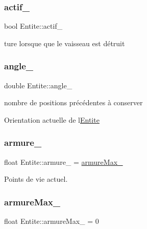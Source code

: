 \subsubsection{\texorpdfstring{actif\+\_\+}{actif\_}}
{\footnotesize\ttfamily bool Entite\+::actif\+\_\+\hspace{0.3cm}{\ttfamily [protected]}}



ture lorsque que le vaisseau est détruit 

\mbox{\label{class_entite_a0ff0818c364a2d4282f99e309728f479}} 
\subsubsection{\texorpdfstring{angle\+\_\+}{angle\_}}
{\footnotesize\ttfamily double Entite\+::angle\+\_\+\hspace{0.3cm}{\ttfamily [protected]}}



nombre de positions précédentes à conserver 

Orientation actuelle de l\textquotesingle{}\hyperlink{class_entite}{Entite} \mbox{\label{class_entite_a014535fad669c3d890a216f9e8049d09}} 
\subsubsection{\texorpdfstring{armure\+\_\+}{armure\_}}
{\footnotesize\ttfamily float Entite\+::armure\+\_\+ = \hyperlink{class_entite_a2c5851310f0809f805205f23f443a48b}{armure\+Max\+\_\+}\hspace{0.3cm}{\ttfamily [protected]}}



Points de vie actuel. 

\mbox{\label{class_entite_a2c5851310f0809f805205f23f443a48b}} 
\subsubsection{\texorpdfstring{armure\+Max\+\_\+}{armureMax\_}}
{\footnotesize\ttfamily float Entite\+::armure\+Max\+\_\+ = 0\hspace{0.3cm}{\ttfamily [protected]}}



